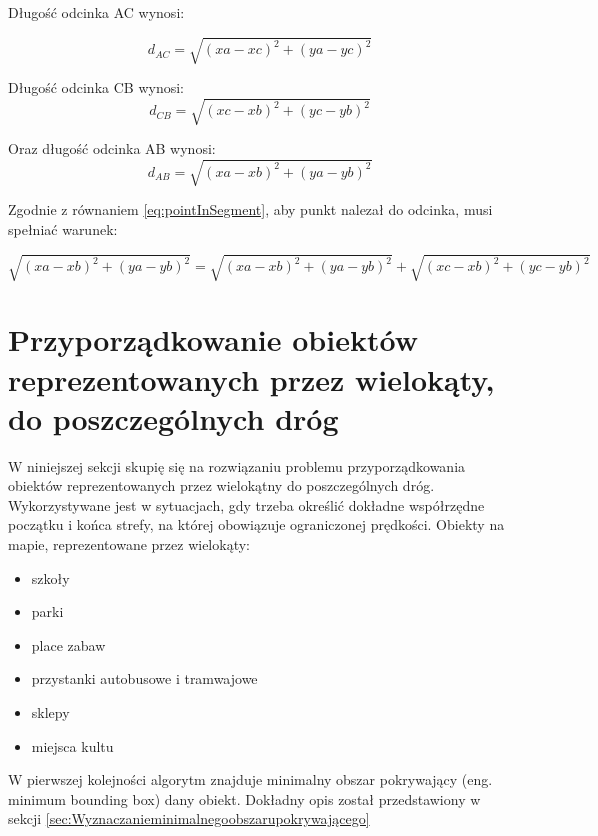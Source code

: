 Długość odcinka AC wynosi:

\begin{equation} \label{eq:distanceBetweenTwoPointAC}
d_{AC} = \sqrt{(xa - xc)^2 + (ya - yc)^2}
\end{equation}\newline

Długość odcinka CB wynosi:
\begin{equation} \label{eq:distanceBetweenTwoPointCB}
d_{CB} = \sqrt{(xc - xb)^2 + (yc - yb)^2}
\end{equation}\newline

Oraz długość odcinka AB wynosi:
\begin{equation}
d_{AB} = \sqrt{(xa - xb)^2 + (ya - yb)^2}
\end{equation}\newline

Zgodnie z równaniem \ref{eq:pointInSegment}, aby punkt nalezał do odcinka, musi spełniać warunek:

\begin{equation}
\sqrt{(xa - xb)^2 + (ya - yb)^2} = \sqrt{(xa - xb)^2 + (ya - yb)^2} + \sqrt{(xc - xb)^2 + (yc - yb)^2}
\end{equation}\newline


\newpage
\section{Przyporządkowanie obiektów reprezentowanych przez wielokąty, do poszczególnych dróg}
\label{sec:polygonLineDistance}

W niniejszej sekcji skupię się na rozwiązaniu problemu przyporządkowania obiektów reprezentowanych przez wielokątny do poszczególnych dróg. Wykorzystywane jest w sytuacjach, gdy trzeba określić dokładne współrzędne początku i końca strefy, na której obowiązuje ograniczonej prędkości. Obiekty na mapie, reprezentowane przez wielokąty:
\begin{itemize}
\item szkoły
\item parki
\item place zabaw
\item przystanki autobusowe i tramwajowe
\item sklepy
\item miejsca kultu
\end{itemize}


W pierwszej kolejności algorytm znajduje minimalny obszar pokrywający (eng. minimum bounding box) dany obiekt. Dokładny opis został przedstawiony w sekcji \ref{sec:Wyznaczanieminimalnegoobszarupokrywającego}


